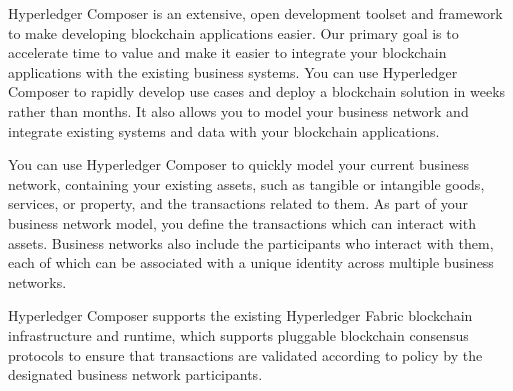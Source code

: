 Hyperledger Composer is an extensive, open development toolset and framework to make developing blockchain applications easier. Our primary goal is to accelerate time to value and make it easier to integrate your blockchain applications with the existing business systems. You can use Hyperledger Composer to rapidly develop use cases and deploy a blockchain solution in weeks rather than months. It also allows you to model your business network and integrate existing systems and data with your blockchain applications.

You can use Hyperledger Composer to quickly model your current business network, containing your existing assets, such as tangible or intangible goods, services, or property, and the transactions related to them. As part of your business network model, you define the transactions which can interact with assets. Business networks also include the participants who interact with them, each of which can be associated with a unique identity across multiple business networks.

Hyperledger Composer supports the existing Hyperledger Fabric blockchain infrastructure and runtime, which supports pluggable blockchain consensus protocols to ensure that transactions are validated according to policy by the designated business network participants.
